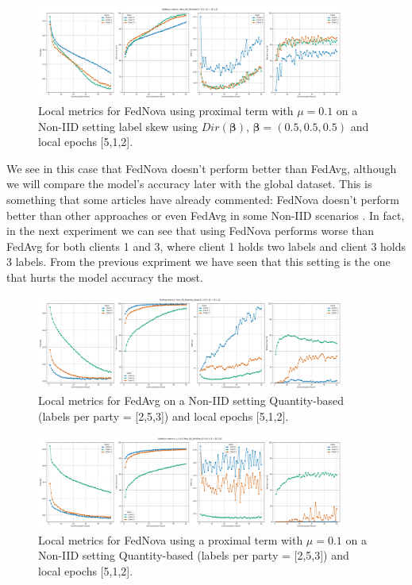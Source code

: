 \begin{figure}[H]
  \centering
  \includegraphics[width=0.9\textwidth]{figures/2-Federated_Learning/FedNova_NonDirichlet_LE_512.png}
  \caption{Local metrics for FedNova using proximal term with $\mu=0.1$ on a Non-IID setting label skew using $Dir(\boldsymbol{\beta})$, $\boldsymbol{\beta}=(0.5, 0.5, 0.5)$ and local epochs [5,1,2].}
  \label{fig:FedNova_NonDirichlet_LE_512}
\end{figure}

We see in this case that FedNova doesn't perform better than FedAvg, although we will compare the model's accuracy later with the global dataset. This is something that some articles have already commented: FedNova doesn't perform better than other approaches or even FedAvg in some Non-IID scenarios \cite{li2021}.
In fact, in the next experiment we can see that using FedNova performs worse than FedAvg for both clients 1 and 3, where client 1 holds two labels and client 3 holds 3 labels. From the previous expriment we have seen that this setting is the one that hurts the model accuracy the most.
\begin{figure}[H]
  \centering
  \includegraphics[width=0.9\textwidth]{figures/2-Federated_Learning/FedAvg_QuantityBased_Labels_253_LE_512.png}
  \caption{Local metrics for FedAvg  on a Non-IID setting Quantity-based (labels per party = [2,5,3]) and local epochs [5,1,2].}
  \label{fig:FedAvg_QuantityBased_LabelsPerParty_253_LE_512}
\end{figure}


\begin{figure}[H]
  \centering
  \includegraphics[width=0.9\textwidth]{figures/2-Federated_Learning/FedNova_QuantityBased_Labels_253_LE_512.png}
  \caption{Local metrics for FedNova using a proximal term with $\mu=0.1$ on a Non-IID setting Quantity-based (labels per party = [2,5,3]) and local epochs [5,1,2].}
  \label{fig:FedNova_QuantityBased_LabelsPerParty_253_LE_512}
\end{figure}

